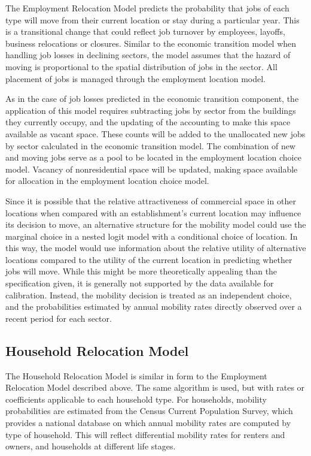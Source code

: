 The Employment Relocation Model predicts the probability that jobs
of each type will move from their current location or stay during
a particular year. This is a transitional change that could
reflect job turnover by employees, layoffs, business relocations
or closures. Similar to the economic transition model when
handling job losses in declining sectors, the model assumes that
the hazard of moving is proportional to the spatial distribution
of jobs in the sector.  All placement of jobs is managed through
the employment location model.

As in the case of job losses predicted in the economic transition
component, the application of this model requires subtracting jobs
by sector from the buildings they currently occupy, and the
updating of the accounting to make this space available as vacant
space. These counts will be added to the unallocated new jobs by
sector calculated in the economic transition model. The
combination of new and moving jobs serve as a pool to be located
in the employment location choice model. Vacancy of nonresidential
space will be updated, making space available for allocation in
the employment location choice model.

Since it is possible that the relative attractiveness of
commercial space in other locations when compared with an
establishment's current location may influence its decision to
move, an alternative structure for the mobility model could use
the marginal choice in a nested logit model with a conditional
choice of location. In this way, the model would use information
about the relative utility of alternative locations compared to
the utility of the current location in predicting whether jobs
will move.  While this might be more theoretically appealing than
the specification given, it is generally not supported by the data
available for calibration. Instead, the mobility decision is
treated as an independent choice, and the probabilities estimated
by annual mobility rates directly observed over a recent period
for each sector.


\subsection{Household Relocation Model}
\label{sec:model-system-household-relocation-model}
%
The Household Relocation Model is similar in form to the Employment
Relocation Model described above.  The same algorithm is used, but
with rates or coefficients applicable to each household type.  For
households, mobility probabilities are estimated from the Census
Current Population Survey, which provides a national database on
which annual mobility rates are computed by type of household.
This will reflect differential mobility rates for renters and
owners, and households at different life stages.


